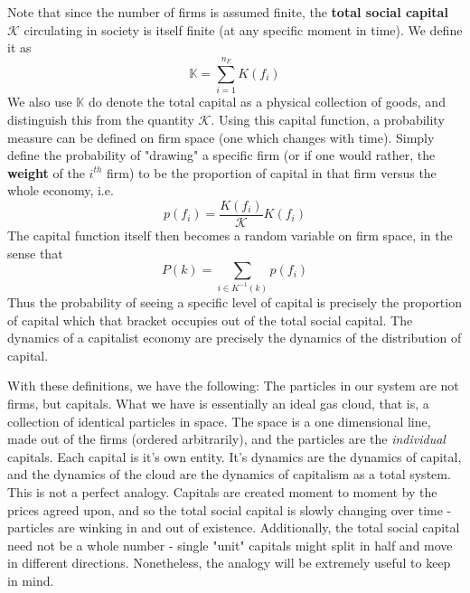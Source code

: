 Note that since the number of firms is assumed finite, the \textbf{total social capital} $\mathcal{K}$ circulating in society is itself finite (at any specific moment in time). We define it as
\[ \mathbb{K} = \sum_{i =1}^{n_F}K(f_i) \]
We also use $\mathbb{K}$ do denote the total capital as a physical collection of goods, and distinguish this from the quantity $\mathcal{K}$. Using this capital function, a probability measure can be defined on firm space (one which changes with time). Simply define the probability of "drawing" a specific firm (or if one would rather, the \textbf{weight} of the $i^{th}$ firm) to be the proportion of capital in that firm versus the whole economy, i.e. 
\[ p(f_i) = \frac{K(f_i)}{\mathcal{K}}K(f_i) \]
The capital function itself then becomes a random variable on firm space, in the sense that
\[ P(k) = \sum_{i \in K^{-1}(k)}p(f_i) \]
Thus the probability of seeing a specific level of capital is precisely the proportion of capital which that bracket occupies out of the total social capital. The dynamics of a capitalist economy are precisely the dynamics of the distribution of capital. \par 
With these definitions, we have the following: The particles in our system are not firms, but capitals. What we have is essentially an ideal gas cloud, that is, a collection of identical particles in space. The space is a one dimensional line, made out of the firms (ordered arbitrarily), and the particles are the \textit{individual} capitals. Each capital is it's own entity. It's dynamics are the dynamics of capital, and the dynamics of the cloud are the dynamics of capitalism as a total system. This is not a perfect analogy. Capitals are created moment to moment by the prices agreed upon, and so the total social capital is slowly changing over time - particles are winking in and out of existence. Additionally, the total social capital need not be a whole number - single "unit" capitals might split in half and move in different directions. Nonetheless, the analogy will be extremely useful to keep in mind. \par 
